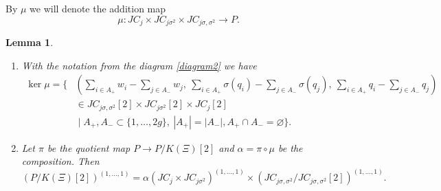 \documentclass{article}
\newtheorem{lem}[thm]{Lemma}
\numberwithin{equation}{section}
\newcommand{\s}{\sigma}
\begin{document}
By $\mu$ we will denote the addition map $$\mu: JC_{j}\times JC_{j\s^2} \times JC_{j\s, \s^2} \to P.$$

\begin{lem}
\begin{enumerate}
\label{geomprym}
    \item[i)] With the notation from the diagram \ref{diagram2} we have
    $$\begin{aligned}
\ker{\mu} = \Bigg\{ 
& \left( \sum_{i \in A_+} w_i - \sum_{j \in A_-} w_j, \ \sum_{i \in A_+} \s(q_i) - \sum_{j \in A_-} \s(q_j), \ \sum_{i \in A_+} q_i - \sum_{j \in A_-} q_j \right) \\
& \in JC_{j\sigma, \sigma^2}[2] \times JC_{j\sigma^2}[2] \times JC_{j}[2] \\
& \;\Bigg|\; A_+, A_- \subset \{1,\ldots,2g\}, \ |A_+| = |A_-|, A_+ \cap A_- = \varnothing \Bigg\}.
\end{aligned}$$
    \item[ii)] Let $\pi$ be the quotient map $P \to P/K(\Xi)[2]$ and $\alpha = \pi \circ \mu$ be the composition. Then $$(P/K(\Xi)[2])^{(1,\ldots,1)} = \alpha(JC_{j}\times JC_{j\s^2})^{(1,\ldots,1)} \times (JC_{j\s, \s^2}/JC_{j\s, \s^2}[2])^{(1,\ldots,1)}.$$
\end{enumerate}
    
\end{lem}
\end{document}
